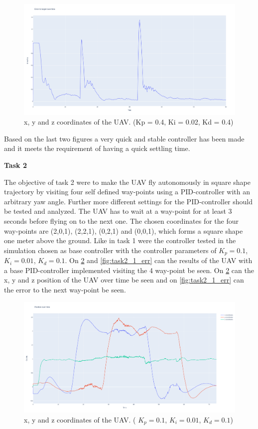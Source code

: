 \documentclass[conference]{IEEEtran}
\begin{document}
\begin{figure}[hbtp]
	\centering
	\includegraphics[width=1.0\linewidth]{images/task1_9_err.png}
	\caption{x, y and z coordinates of the UAV. (Kp = 0.4, Ki = 0.02, Kd = 0.4)}
	\label{fig:task1_9_err}
\end{figure}

Based on the last two figures a very quick and stable controller has been made and it meets the requirement of having a quick settling time.

\textbf{Task 2}

The objective of task 2 were to make the UAV fly autonomously in square shape trajectory by visiting four self defined way-points using a PID-controller with an arbitrary yaw angle. Further more different settings for the PID-controller should be tested and analyzed. The UAV has to wait at a way-point for at least 3 seconds before flying on to the next one. 
The chosen coordinates for the four way-points are (2,0,1), (2,2,1), (0,2,1) and (0,0,1), which forms a square shape one meter above the ground. Like in task 1 were the controller tested in the simulation chosen as base controller with the controller parameters of $K_p = 0.1$, $K_i = 0.01$, $K_d = 0.1$. On \cref{fig:task2_1_pos} and \cref{fig:task2_1_err} can the results of the UAV with a base PID-controller implemented visiting the 4 way-point be seen.
On \cref{fig:task2_1_pos} can the x, y and z position of the UAV over time be seen and on \cref{fig:task2_1_err} can the error to the next way-point be seen. 


\begin{figure}[hbtp]
	\centering
	\includegraphics[width=1.0\linewidth]{images/task2_1_pos.png}
	\caption{x, y and z coordinates of the UAV. ( $K_p = 0.1$, $K_i = 0.01$, $K_d = 0.1$)}
	\label{fig:task2_1_pos}
\end{figure}
\end{document}
